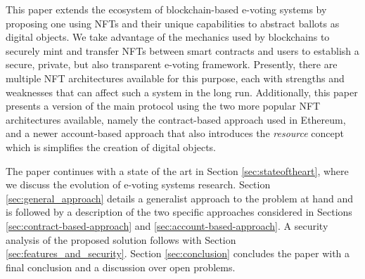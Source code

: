 \documentclass[../main.tex]{subfiles}
\begin{document}
\par
This paper extends the ecosystem of blockchain-based e-voting systems by proposing one using NFTs and their unique capabilities to abstract ballots as digital objects. We take advantage of the mechanics used by blockchains to securely mint and transfer NFTs between smart contracts and users to establish a secure, private, but also transparent e-voting framework. Presently, there are multiple NFT architectures available for this purpose, each with strengths and weaknesses that can affect such a system in the long run. Additionally, this paper presents a version of the main protocol using the two more popular NFT architectures available, namely the contract-based approach used in Ethereum, and a newer account-based approach that also introduces the \textit{resource} concept which is simplifies the creation of digital objects.
\par
The paper continues with a state of the art in Section \ref{sec:stateoftheart}, where we discuss the evolution of e-voting systems research. Section \ref{sec:general_approach} details a generalist approach to the problem at hand and is followed by a description of the two specific approaches considered in Sections \ref{sec:contract-based-approach} and \ref{sec:account-based-approach}. A security analysis of the proposed solution follows with Section \ref{sec:features_and_security}. Section \ref{sec:conclusion} concludes the paper with a final conclusion and a discussion over open problems.
\end{document}
